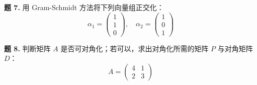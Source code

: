 \documentclass[12pt, a4paper]{article}
\begin{document}
\vspace{0.8em}
\noindent\textbf{题 7.} 用 Gram-Schmidt 方法将下列向量组正交化：
\[\alpha_1 = \begin{pmatrix} 1 \\ 1 \\ 0 \end{pmatrix} , \quad \alpha_2 = \begin{pmatrix} 1 \\ 0 \\ 1 \end{pmatrix}\]

\vspace{0.8em}
\noindent\textbf{题 8.} 判断矩阵 $A$ 是否可对角化；若可以，求出对角化所需的矩阵 $P$ 与对角矩阵 $D$：
\[A = \begin{pmatrix} 4 & 1 \\ 2 & 3 \end{pmatrix}\]
\end{document}
